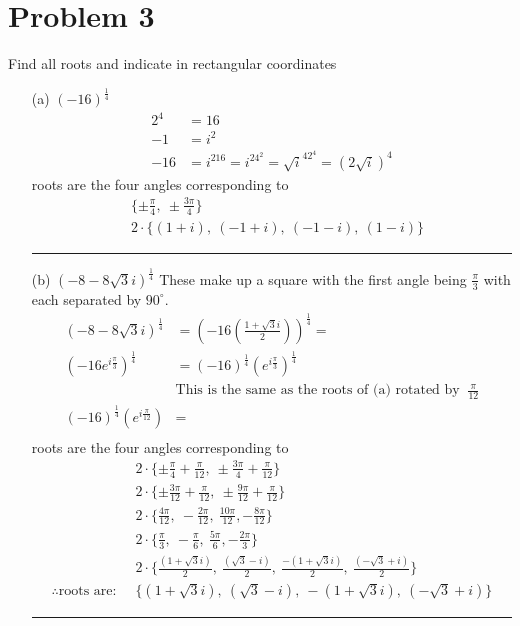 \documentclass{article}
\begin{document}
\section*{Problem 3}
Find all roots and indicate in rectangular coordinates
\begin{enumerate}
\item[(a)] $(-16)^{\frac{1}{4}}$
  \begin{align*}
    2^{4} &= 16\\
    -1 &= i^2 \\
    -16 &= i^216 = i^24^2 = \sqrt{i}^42^4 = (2\sqrt{i})^4 
  \end{align*}
  roots are the four angles corresponding to
  \begin{align*}
    &\{\pm \frac{\pi}{4},\ \pm \frac{3\pi}{4}\} \\
      &2\cdot \{(1+i),\ (-1+i),\ (-1-i),\ (1-i)\}
  \end{align*}
\hrule
\item[(b)] $(-8-8\sqrt{3}i)^{\frac{1}{4}}$
  These make up a square with the first angle being $\frac{\pi}{3}$ with each separated by $90^{\circ}$.
  \begin{align*}
    (-8-8\sqrt{3}i)^{\frac{1}{4}} &= \left(-16\left(\frac{1+\sqrt{3}i}{2}\right)\right)^{\frac{1}{4}} = \\
    (-16e^{i\frac{\pi}{3}})^{\frac{1}{4}} &= (-16)^{\frac{1}{4}}(e^{i\frac{\pi}{3}})^{\frac{1}{4}} \\
                                  &\text{This is the same as the roots of (a) rotated by }\ \frac{\pi}{12}\\
    (-16)^{\frac{1}{4}}(e^{i\frac{\pi}{12}}) &= \\
  \end{align*}
    roots are the four angles corresponding to
  \begin{align*}
    & 2\cdot\{\pm \frac{\pi}{4} + \frac{\pi}{12},\ \pm \frac{3\pi}{4} + \frac{\pi}{12}\} \\
    &2\cdot \{\pm \frac{3\pi}{12} + \frac{\pi}{12},\ \pm \frac{9\pi}{12} + \frac{\pi}{12}\} \\
    &2\cdot \{ \frac{4\pi}{12},\ -\frac{2\pi}{12},\ \frac{10\pi}{12}, -\frac{8\pi}{12}\} \\
    &2\cdot \{ \frac{\pi}{3},\ -\frac{\pi}{6},\ \frac{5\pi}{6}, -\frac{2\pi}{3}\} \\
      &2\cdot \{\frac{(1+\sqrt{3}i)}{2},\ \frac{(\sqrt{3}-i)}{2},\ \frac{-(1+\sqrt{3}i)}{2},\ \frac{(-\sqrt{3}+i)}{2}\}\\
      \therefore \text{roots are: }\ &\{(1+\sqrt{3}i),\ (\sqrt{3}-i),\ -(1+\sqrt{3}i),\ (-\sqrt{3}+i)\}
  \end{align*}

\hrule
\end{enumerate}
\end{document}
